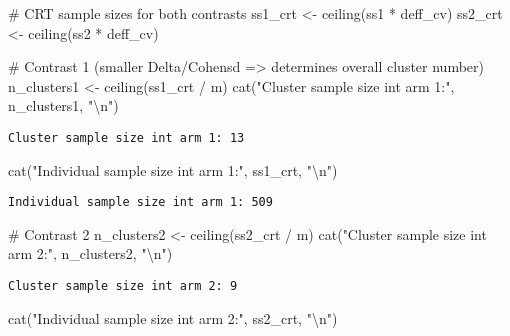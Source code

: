 \documentclass[
  letterpaper,
  DIV=11,
  numbers=noendperiod]{scrartcl}
\newenvironment{Shaded}{\begin{snugshade}}{\end{snugshade}}
\newcommand{\CommentTok}[1]{\textcolor[rgb]{0.37,0.37,0.37}{#1}}
\newcommand{\FunctionTok}[1]{\textcolor[rgb]{0.28,0.35,0.67}{#1}}
\newcommand{\NormalTok}[1]{\textcolor[rgb]{0.00,0.23,0.31}{#1}}
\newcommand{\OtherTok}[1]{\textcolor[rgb]{0.00,0.23,0.31}{#1}}
\newcommand{\SpecialCharTok}[1]{\textcolor[rgb]{0.37,0.37,0.37}{#1}}
\newcommand{\StringTok}[1]{\textcolor[rgb]{0.13,0.47,0.30}{#1}}
\begin{document}
\begin{Shaded}
\begin{Highlighting}[]
\CommentTok{\# CRT sample sizes for both contrasts}
\NormalTok{ss1\_crt }\OtherTok{\textless{}{-}} \FunctionTok{ceiling}\NormalTok{(ss1 }\SpecialCharTok{*}\NormalTok{ deff\_cv)}
\NormalTok{ss2\_crt }\OtherTok{\textless{}{-}} \FunctionTok{ceiling}\NormalTok{(ss2 }\SpecialCharTok{*}\NormalTok{ deff\_cv)}

\CommentTok{\# Contrast 1 (smaller Delta/Cohens\textquotesingle{}d =\textgreater{} determines overall cluster number)}
\NormalTok{n\_clusters1 }\OtherTok{\textless{}{-}} \FunctionTok{ceiling}\NormalTok{(ss1\_crt }\SpecialCharTok{/}\NormalTok{ m)}
\FunctionTok{cat}\NormalTok{(}\StringTok{"Cluster sample size int arm 1:"}\NormalTok{, n\_clusters1, }\StringTok{"}\SpecialCharTok{\textbackslash{}n}\StringTok{"}\NormalTok{)}
\end{Highlighting}
\end{Shaded}

\begin{verbatim}
Cluster sample size int arm 1: 13 
\end{verbatim}

\begin{Shaded}
\begin{Highlighting}[]
\FunctionTok{cat}\NormalTok{(}\StringTok{"Individual sample size int arm 1:"}\NormalTok{, ss1\_crt, }\StringTok{"}\SpecialCharTok{\textbackslash{}n}\StringTok{"}\NormalTok{)}
\end{Highlighting}
\end{Shaded}

\begin{verbatim}
Individual sample size int arm 1: 509 
\end{verbatim}

\begin{Shaded}
\begin{Highlighting}[]
\CommentTok{\# Contrast 2}
\NormalTok{n\_clusters2 }\OtherTok{\textless{}{-}} \FunctionTok{ceiling}\NormalTok{(ss2\_crt }\SpecialCharTok{/}\NormalTok{ m)}
\FunctionTok{cat}\NormalTok{(}\StringTok{"Cluster sample size int arm 2:"}\NormalTok{, n\_clusters2, }\StringTok{"}\SpecialCharTok{\textbackslash{}n}\StringTok{"}\NormalTok{)}
\end{Highlighting}
\end{Shaded}

\begin{verbatim}
Cluster sample size int arm 2: 9 
\end{verbatim}

\begin{Shaded}
\begin{Highlighting}[]
\FunctionTok{cat}\NormalTok{(}\StringTok{"Individual sample size int arm 2:"}\NormalTok{, ss2\_crt, }\StringTok{"}\SpecialCharTok{\textbackslash{}n}\StringTok{"}\NormalTok{)}
\end{Highlighting}
\end{Shaded}
\end{document}
